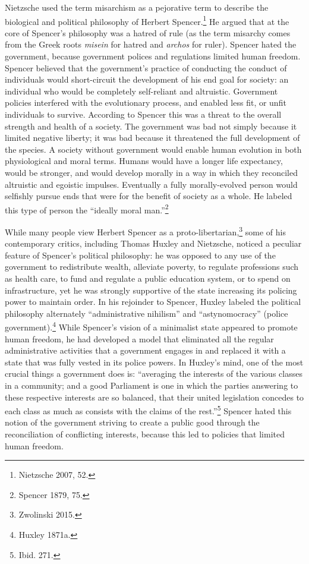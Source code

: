\documentclass[12pt,]{article}
\begin{document}
Nietzsche used the term misarchism as a pejorative term to describe the
biological and political philosophy of Herbert Spencer.\footnote{Nietzsche
  2007, 52. } He argued that at the core of Spencer's philosophy was a
hatred of rule (as the term misarchy comes from the Greek roots
\emph{misein} for hatred and \emph{archos} for ruler). Spencer hated the
government, because government polices and regulations limited human
freedom. Spencer believed that the government's practice of conducting
the conduct of individuals would short-circuit the development of his
end goal for society: an individual who would be completely self-reliant
and altruistic. Government policies interfered with the evolutionary
process, and enabled less fit, or unfit individuals to survive.
According to Spencer this was a threat to the overall strength and
health of a society. The government was bad not simply because it
limited negative liberty; it was bad because it threatened the full
development of the species. A society without government would enable
human evolution in both physiological and moral terms. Humans would have
a longer life expectancy, would be stronger, and would develop morally
in a way in which they reconciled altruistic and egoistic impulses.
Eventually a fully morally-evolved person would selfishly pursue ends
that were for the benefit of society as a whole. He labeled this type of
person the ``ideally moral man.''\footnote{Spencer 1879, 75. }

While many people view Herbert Spencer as a proto-libertarian,\footnote{Zwolinski
  2015. } some of his contemporary critics, including Thomas Huxley and
Nietzsche, noticed a peculiar feature of Spencer's political philosophy:
he was opposed to any use of the government to redistribute wealth,
alleviate poverty, to regulate professions such as health care, to fund
and regulate a public education system, or to spend on infrastructure,
yet he was strongly supportive of the state increasing its policing
power to maintain order. In his rejoinder to Spencer, Huxley labeled the
political philosophy alternately ``administrative nihilism'' and
``astynomocracy'' (police government).\footnote{Huxley 1871a. } While
Spencer's vision of a minimalist state appeared to promote human
freedom, he had developed a model that eliminated all the regular
administrative activities that a government engages in and replaced it
with a state that was fully vested in its police powers. In Huxley's
mind, one of the most crucial things a government does is: ``averaging
the interests of the various classes in a community; and a good
Parliament is one in which the parties answering to these respective
interests are so balanced, that their united legislation concedes to
each class as much as consists with the claims of the rest.''\footnote{Ibid.
  271. } Spencer hated this notion of the government striving to create
a public good through the reconciliation of conflicting interests,
because this led to policies that limited human freedom.
\end{document}
